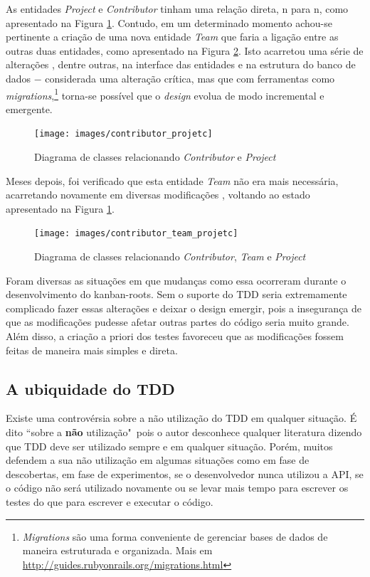 As entidades \textit{Project} e \textit{Contributor} tinham uma relação direta, n para n, como apresentado na Figura \ref{img:contributor_projetc}. Contudo, em um determinado momento achou-se pertinente a criação de uma nova entidade \textit{Team} que faria a ligação entre as outras duas entidades, como apresentado na Figura \ref{img:contributor_team_projetc}. Isto acarretou uma série de alterações \cite{CommitAddTeam}, dentre outras, na interface das entidades e na estrutura do banco de dados $-$ considerada uma alteração crítica, mas que com ferramentas como \textit{migrations},\footnote{\textit{Migrations} são uma forma conveniente de gerenciar bases de dados de maneira estruturada e organizada. Mais em \url{http://guides.rubyonrails.org/migrations.html}} torna-se possível que o \textit{design} evolua de modo incremental e emergente.

\begin{figure}[h]
  \center
  \caption{Diagrama de classes relacionando \textit{Contributor} e \textit{Project}}
  \texttt{[image: images/contributor\_projetc]}
  \label{img:contributor_projetc}
\end{figure}

Meses depois, foi verificado que esta entidade \textit{Team} não era mais necessária, acarretando novamente em diversas modificações \cite{CommitRemoveTeam}, voltando ao estado apresentado na Figura \ref{img:contributor_projetc}.

\begin{figure}[h]
  \center
  \caption{Diagrama de classes relacionando \textit{Contributor}, \textit{Team} e \textit{Project}}
  \texttt{[image: images/contributor\_team\_projetc]}
  \label{img:contributor_team_projetc}
\end{figure}

Foram diversas as situações em que mudanças como essa ocorreram durante o desenvolvimento do kanban-roots. Sem o suporte do TDD seria extremamente complicado fazer essas alterações e deixar o design emergir, pois a insegurança de que as modificações pudesse afetar outras partes do código seria muito grande. Além disso, a criação a priori dos testes favoreceu que as modificações fossem feitas de maneira mais simples e direta.

\subsection{A ubiquidade do TDD}
\label{sub:a_ubiquidade_do_tdd}

Existe uma controvérsia sobre a não utilização do TDD em qualquer situação. É dito ``sobre a \textbf{não} utilização"\ pois o autor desconhece qualquer literatura dizendo que TDD deve ser utilizado sempre e em qualquer situação. Porém, muitos defendem a sua não utilização em algumas situações como em fase de descobertas, em fase de experimentos, se o desenvolvedor nunca utilizou a API, se o código não será utilizado novamente ou se levar mais tempo para escrever os testes do que para escrever e executar o código.

